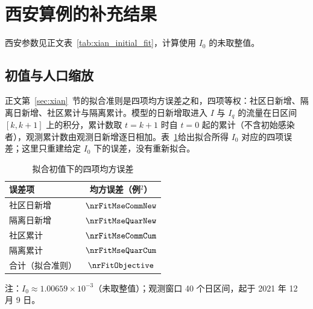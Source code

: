\section{西安算例的补充结果}
\label{sec:sup:xian}
西安参数见正文表~\ref{tab:xian_initial_fit}，计算使用 $I_0$ 的未取整值。

\subsection{初值与人口缩放}
\label{sec:sup:xian:settings}
正文第~\ref{sec:xian}~节的拟合准则是四项均方误差之和，四项等权：社区日新增、隔离日新增、社区累计与隔离累计。模型的日新增取进入 $I$ 与 $I_q$ 的流量在日区间 $[k,k+1]$ 上的积分，累计数取 $t=k+1$ 时自 $t=0$ 起的累计（不含初始感染者），观测累计数由观测日新增逐日相加。表~\ref{tab:sup:fit}给出拟合所得 $I_0$ 对应的四项误差；这里只重建给定 $I_0$ 下的误差，没有重新拟合。
\begin{table}[htbp]
\centering\small
\renewcommand{\arraystretch}{1.2}
\begin{threeparttable}
\caption{拟合初值下的四项均方误差}
\label{tab:sup:fit}
\begin{tabular*}{0.6\linewidth}{@{\extracolsep{\fill}}lc@{}}
\toprule
误差项 & 均方误差（例$^2$）\\
\midrule
社区日新增 & $\nrFitMseCommNew$\\
隔离日新增 & $\nrFitMseQuarNew$\\
社区累计 & $\nrFitMseCommCum$\\
隔离累计 & $\nrFitMseQuarCum$\\
合计（拟合准则） & $\nrFitObjective$\\
\bottomrule
\end{tabular*}
\begin{tablenotes}[flushleft]\footnotesize
\item 注：$I_0\approx1.00659\times10^{-3}$（未取整值）；观测窗口 40 个日区间，起于 2021 年 12 月 9 日。
\end{tablenotes}
\end{threeparttable}
\end{table}

